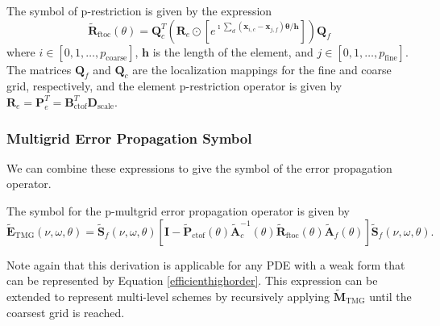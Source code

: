 \documentclass[review]{siamart190516}
\begin{document}
\begin{definition}
The symbol of p-restriction is given by the expression
\begin{equation}
\tilde{\mathbf{R}}_{\text{ftoc}} \left( \theta \right) = \mathbf{Q}_c^T \left( \mathbf{R}_e \odot \left[ e^{\imath \sum_d \left( \mathbf{x}_{i, c} - \mathbf{x}_{j, f} \right) \mathbf{\theta} / \mathbf{h}} \right] \right) \mathbf{Q}_f
\end{equation}
where $i \in \left[ 0, 1, \dots, p_{\text{coarse}} \right]$, $\mathbf{h}$ is the length of the element, and $j \in \left[ 0, 1, \dots, p_{\text{fine}} \right]$.
The matrices $\mathbf{Q}_f$ and $\mathbf{Q}_c$ are the localization mappings for the fine and coarse grid, respectively, and the element p-restriction operator is given by $\mathbf{R}_e = \mathbf{P}_e^T = \mathbf{B}_{\text{ctof}}^T \mathbf{D}_{\text{scale}}$.
\end{definition}\label{def:restriction_symbol}

\subsubsection{Multigrid Error Propagation Symbol}\label{sec:multigridsymbol}

We can combine these expressions to give the symbol of the error propagation operator.

\begin{definition}
The symbol for the p-multgrid error propagation operator is given by
\begin{equation}
\tilde{\mathbf{E}}_{\text{TMG}} \left( \nu, \omega, \theta \right) = \tilde{\mathbf{S}}_f \left( \nu, \omega, \theta \right) \left[ \mathbf{I} - \tilde{\mathbf{P}}_{\text{ctof}} \left( \theta \right) \tilde{\mathbf{A}}_c^{-1} \left( \theta \right) \tilde{\mathbf{R}}_{\text{ftoc}} \left( \theta \right) \tilde{\mathbf{A}}_f \left( \theta \right) \right] \tilde{\mathbf{S}}_f \left( \nu, \omega, \theta \right).
\end{equation}
\end{definition}\label{def:pmultigrid_symbol}

Note again that this derivation is applicable for any PDE with a weak form that can be represented by Equation \ref{efficienthighorder}.
This expression can be extended to represent multi-level schemes by recursively applying $\tilde{\mathbf{M}}_{\text{TMG}}$ until the coarsest grid is reached.
\end{document}
